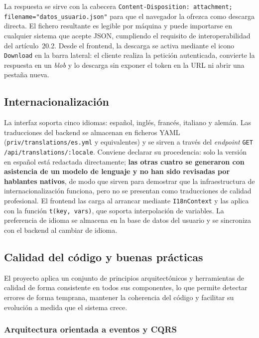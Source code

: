 La respuesta se sirve con la cabecera \texttt{Content-Disposition: attachment; filename="datos\_usuario.json"} para que el navegador la ofrezca como descarga directa. El fichero resultante es legible por máquina y puede importarse en cualquier sistema que acepte JSON, cumpliendo el requisito de interoperabilidad del artículo~20.2. Desde el frontend, la descarga se activa mediante el icono \texttt{Download} en la barra lateral: el cliente realiza la petición autenticada, convierte la respuesta en un \emph{blob} y lo descarga sin exponer el token en la URL ni abrir una pestaña nueva.

\subsection{Internacionalización}
\label{sec:i18n}

\begin{sloppypar}
La interfaz soporta cinco idiomas: español, inglés, francés, italiano y alemán. Las traducciones del backend se almacenan en ficheros YAML (\texttt{priv/translations/es.yml} y equivalentes) y se sirven a través del \emph{endpoint} \texttt{GET /api/translations/:locale}. Conviene declarar su procedencia: solo la versión en español está redactada directamente; \textbf{las otras cuatro se generaron con asistencia de un modelo de lenguaje y no han sido revisadas por hablantes nativos}, de modo que sirven para demostrar que la infraestructura de internacionalización funciona, pero no se presentan como traducciones de calidad profesional. El frontend las carga al arrancar mediante \texttt{I18nContext} y las aplica con la función \texttt{t(key, vars)}, que soporta interpolación de variables. La preferencia de idioma se almacena en la base de datos del usuario y se sincroniza con el backend al cambiar de idioma.
\end{sloppypar}

\subsection{Calidad del código y buenas prácticas}
\label{sec:calidad}

El proyecto aplica un conjunto de principios arquitectónicos y herramientas de calidad de forma consistente en todos sus componentes, lo que permite detectar errores de forma temprana, mantener la coherencia del código y facilitar su evolución a medida que el sistema crece.

\subsubsection{Arquitectura orientada a eventos y CQRS}

